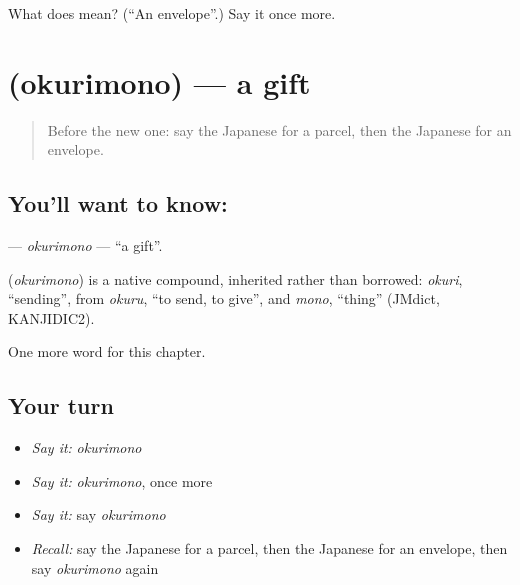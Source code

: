 \begin{tcolorbox}[breakable,colback=teal!4,colframe=teal!35!black,title={Before you move on}]
What does  mean? (\textquotedblleft{}An envelope\textquotedblright{}.) Say it once more.
\end{tcolorbox}
\section[\texorpdfstring{\ja{おくりもの} (okurimono)}{おくりもの (okurimono)}]{ (okurimono) — a gift}

\label{lesson:JA-C104-okurimono}



\begin{quote}
Before the new one: say the Japanese for a parcel, then the Japanese for an envelope.
\end{quote}

\subsection*{You'll want to know: }
\textbf{} — \emph{okurimono} — \textquotedblleft{}a gift\textquotedblright{}.

\begin{cousinweb}
\textbf{} (\emph{okurimono}) is a native compound, inherited rather than borrowed: \emph{okuri}, \textquotedblleft{}sending\textquotedblright{}, from \emph{okuru}, \textquotedblleft{}to send, to give\textquotedblright{}, and \emph{mono}, \textquotedblleft{}thing\textquotedblright{} (JMdict, KANJIDIC2).
\end{cousinweb}

\begin{grammarlens}[title={What you've built}]
One more word for this chapter.
\end{grammarlens}

\subsection*{Your turn}
\begin{itemize}
\raggedright
  \item \emph{Say it:} \emph{okurimono}
  \item \emph{Say it:} \emph{okurimono}, once more
  \item \emph{Say it:} say \emph{okurimono}
  \item \emph{Recall:} say the Japanese for a parcel, then the Japanese for an envelope, then say \emph{okurimono} again
\end{itemize}

